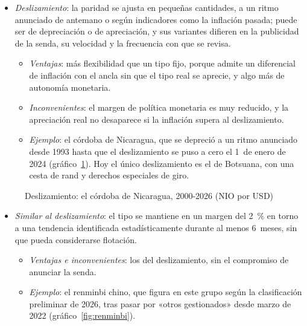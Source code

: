 \documentclass[11pt]{article}
\begin{document}
\begin{itemize}
\item \emph{Deslizamiento}: la paridad se ajusta en pequeñas cantidades, a un ritmo anunciado de antemano o según indicadores como la inflación pasada; puede ser de depreciación o de apreciación, y sus variantes difieren en la publicidad de la senda, su velocidad y la frecuencia con que se revisa.
  \begin{itemize}
  \item \emph{Ventajas}: más flexibilidad que un tipo fijo, porque admite un diferencial de inflación con el ancla sin que el tipo real se aprecie, y algo más de autonomía monetaria.
  \item \emph{Inconvenientes}: el margen de política monetaria es muy reducido, y la apreciación real no desaparece si la inflación supera al deslizamiento.
  \item \emph{Ejemplo}: el córdoba de Nicaragua, que se depreció a un ritmo anunciado desde 1993 hasta que el deslizamiento se puso a cero el 1~de enero de 2024 (gráfico~\ref{fig:cordoba})\nocite{BCN2023Deslizamiento}. Hoy el único deslizamiento es el de Botsuana, con una cesta de rand y derechos especiales de giro\nocite{FMI2026InformeAnual}.
  \end{itemize}
\end{itemize}

\begin{figure}[H]
\centering
\caption{Deslizamiento: el córdoba de Nicaragua, 2000-2026 (NIO por USD)}\label{fig:cordoba}
\end{figure}

\begin{itemize}
\item \emph{Similar al deslizamiento}: el tipo se mantiene en un margen del 2~\% en torno a una tendencia identificada estadísticamente durante al menos 6~meses, sin que pueda considerarse flotación.
  \begin{itemize}
  \item \emph{Ventajas e inconvenientes}: los del deslizamiento, sin el compromiso de anunciar la senda.
  \item \emph{Ejemplo}: el renminbi chino, que figura en este grupo según la clasificación preliminar de 2026, tras pasar por «otros gestionados» desde marzo de 2022 (gráfico~\ref{fig:renminbi})\nocite{FMI2024AREAER2023,FMI2026InformeAnual}.
  \end{itemize}
\end{itemize}
\end{document}
